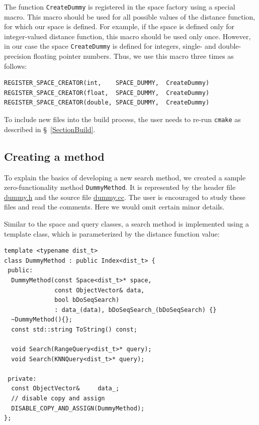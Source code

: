 \documentclass[runningheads,a4paper]{llncs}
\newcommand{\ttt}[1]{\texttt{#1}}
\begin{document}
{The function \ttt{CreateDummy} is registered in the space factory using a special macro.
This macro should be used for all possible values of the distance function,
for which our space is defined. For example, if the space is defined
only for integer-valued distance function, this macro should be used only once.
However, in our case the space \ttt{CreateDummy} is defined for integers,
single- and double-precision floating pointer numbers. Thus, we use this macro
three times as follows:
\begin{verbatim}
REGISTER_SPACE_CREATOR(int,    SPACE_DUMMY,  CreateDummy)
REGISTER_SPACE_CREATOR(float,  SPACE_DUMMY,  CreateDummy)
REGISTER_SPACE_CREATOR(double, SPACE_DUMMY,  CreateDummy)
\end{verbatim}
To include new files into the build process, 
the user needs to re-run \ttt{cmake} as described in \S~\ref{SectionBuild}.

\subsection{Creating a method}\label{SectionCreateMethod}
To explain the basics of developing a new search method,
we created a sample zero-functionality method \texttt{DummyMethod}.
It is represented by 
the header file 
\href{https://github.com/searchivarius/NonMetricSpaceLib/blob/master/similarity_search/include/method/dummy.h}{dummy.h}
and the source file
\href{https://github.com/searchivarius/NonMetricSpaceLib/blob/master/similarity_search/src/method/dummy.cc}{dummy.cc}.
The user is encouraged to study these files and read the comments.
Here we would omit certain minor details.

\newpage
Similar to the space and query classes, a search method is implemented using
a template class, which is parameterized by the distance function value:
\begin{verbatim}
template <typename dist_t>
class DummyMethod : public Index<dist_t> {
 public:
  DummyMethod(const Space<dist_t>* space,
              const ObjectVector& data, 
              bool bDoSeqSearch)
              : data_(data), bDoSeqSearch_(bDoSeqSearch) {}
  ~DummyMethod(){};
  const std::string ToString() const;
   
  void Search(RangeQuery<dist_t>* query);
  void Search(KNNQuery<dist_t>* query);

 private:
  const ObjectVector&     data_;
  // disable copy and assign
  DISABLE_COPY_AND_ASSIGN(DummyMethod);
};
\end{verbatim}

}
\end{document}
